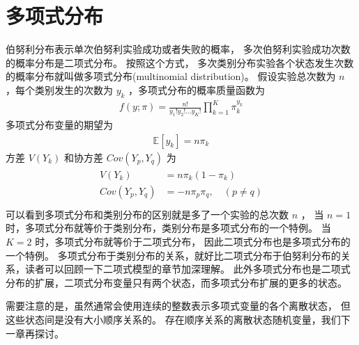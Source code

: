 \documentclass[letterpaper,10pt,english]{sphinxmanual}
\begin{document}
\section{多项式分布}
\label{\detokenize{_u65e0_u5e8f_u79bb_u6563_u6a21_u578b/content:id5}}
伯努利分布表示单次伯努利实验成功或者失败的概率，
多次伯努利实验成功次数的概率分布是二项式分布。
按照这个方式，
多次类别分布实验各个状态发生次数的概率分布就叫做多项式分布(multinomial distribution)。
假设实验总次数为 \(n\)
，每个类别发生的次数为 \(y_k\)
，多项式分布的概率质量函数为
\begin{equation}\label{equation:无序离散模型/content:无序离散模型/content:22}
\begin{split}f(y;\pi) = \frac{n!}{y_1!y_2!\dots y_K! }\prod_{k=1}^{K}  \pi_k^{y_k}\end{split}
\end{equation}
多项式分布变量的期望为
\begin{equation}\label{equation:无序离散模型/content:无序离散模型/content:23}
\begin{split}\mathbb{E}[y_k] = n \pi_k\end{split}
\end{equation}
方差 \(V(Y_k)\) 和协方差 \(Cov(Y_p,Y_q)\) 为
\begin{align}\label{equation:无序离散模型/content:无序离散模型/content:24}\!\begin{aligned}
V(Y_k) &= n \pi_k(1-\pi_k)\\
Cov(Y_p,Y_q) &= - n \pi_p \pi_q, \quad (p \ne q)\\
\end{aligned}\end{align}
可以看到多项式分布和类别分布的区别就是多了一个实验的总次数 \(n\) ，
当 \(n=1\) 时，多项式分布就等价于类别分布，类别分布是多项式分布的一个特例。
当 \(K=2\) 时，多项式分布就等价于二项式分布，
因此二项式分布也是多项式分布的一个特例。
多项式分布于类别分布的关系，就好比二项式分布于伯努利分布的关系，读者可以回顾一下二项式模型的章节加深理解。
此外多项式分布也是二项式分布的扩展，二项式分布变量只有两个状态，而多项式分布扩展的更多的状态。

需要注意的是，虽然通常会使用连续的整数表示多项式变量的各个离散状态，
但这些状态间是没有大小顺序关系的。
存在顺序关系的离散状态随机变量，我们下一章再探讨。
\end{document}
